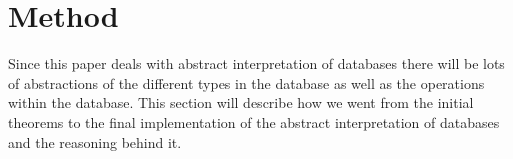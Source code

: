 \section{Method}
\label{sec:method}
Since this paper deals with abstract interpretation of databases there will be lots of abstractions of the different types in the database as well as the operations within the database.
This section will describe how we went from the initial theorems to the final implementation of the abstract interpretation of databases and the reasoning behind it.

